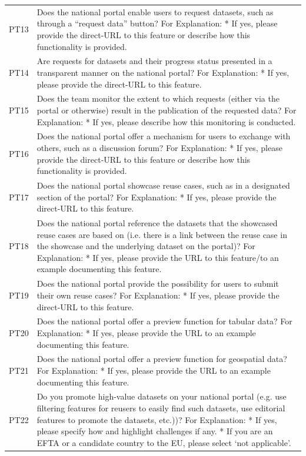 {\begin{longtable}[]{@{}
  L{0.1386}
  L{0.8614}@{}}
PT13 & Does the national portal enable users to request datasets, such as through a ``request data'' button? For Explanation: * If yes, please provide the direct-URL to this feature or describe how this functionality is provided. \\
PT14 & Are requests for datasets and their progress status presented in a transparent manner on the national portal? For Explanation: * If yes, please provide the direct-URL to this feature. \\
PT15 & Does the team monitor the extent to which requests (either via the portal or otherwise) result in the publication of the requested data? For Explanation: * If yes, please describe how this monitoring is conducted. \\
PT16 & Does the national portal offer a mechanism for users to exchange with others, such as a discussion forum? For Explanation: * If yes, please provide the direct-URL to this feature or describe how this functionality is provided. \\
PT17 & Does the national portal showcase reuse cases, such as in a designated section of the portal? For Explanation: * If yes, please provide the direct-URL to this feature. \\
PT18 & Does the national portal reference the datasets that the showcased reuse cases are based on (i.e. there is a link between the reuse case in the showcase and the underlying dataset on the portal)? For Explanation: * If yes, please provide the URL to this feature/to an example documenting this feature. \\
PT19 & Does the national portal provide the possibility for users to submit their own reuse cases? For Explanation: * If yes, please provide the direct-URL to this feature. \\
PT20 & Does the national portal offer a preview function for tabular data? For Explanation: * If yes, please provide the URL to an example documenting this feature. \\
PT21 & Does the national portal offer a preview function for geospatial data? For Explanation: * If yes, please provide the URL to an example documenting this feature. \\
PT22 & Do you promote high-value datasets on your national portal (e.g. use filtering features for reusers to easily find such datasets, use editorial features to promote the datasets, etc.))? For Explanation: * If yes, please specify how and highlight challenges if any. * If you are an EFTA or a candidate country to the EU, please select `not applicable'. \\

\end{longtable}}
